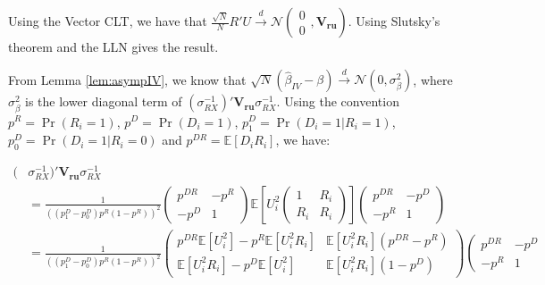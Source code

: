 \documentclass[]{book}
\newcommand{\esp}[1]{\mathbb{E}[ #1 ]}
\theoremstyle{definition}
\theoremstyle{definition}
\theoremstyle{definition}
\theoremstyle{remark}
\begin{document}
Using the Vector CLT, we have that
\(\frac{\sqrt{N}}{N}R'U\stackrel{d}{\rightarrow}\mathcal{N}\left(\begin{array}{c} 0\\ 0\end{array},\mathbf{V_{ru}}\right)\).
Using Slutsky's theorem and the LLN gives the result.

From Lemma \ref{lem:asympIV}, we know that
\(\sqrt{N}(\hat{\beta}_{IV}-\beta)\stackrel{d}{\rightarrow}\mathcal{N}(0,\sigma^2_{\beta})\),
where \(\sigma^2_{\beta}\) is the lower diagonal term of
\((\sigma_{RX}^{-1})'\mathbf{V_{ru}}\sigma_{RX}^{-1}\). Using the
convention \(p^R=\Pr(R_i=1)\), \(p^D=\Pr(D_i=1)\),
\(p^D_1=\Pr(D_i=1|R_i=1)\), \(p^D_0=\Pr(D_i=1|R_i=0)\) and
\(p^{DR}=\esp{D_iR_i}\), we have:

\begin{align*}
(&\sigma_{RX}^{-1})'\mathbf{V_{ru}}\sigma_{RX}^{-1} \\
                   & = \frac{1}{((p^D_1-p^D_0)p^R(1-p^R))^2}
                  \left(\begin{array}{cc}
                         p^{DR}  & -p^R\\
                        -p^D & 1
                          \end{array}\right)
                          \esp{U_i^2\left(\begin{array}{cc}  1 & R_i\\  R_i & R_i\end{array}\right)}
                        \left(\begin{array}{cc}
                                         p^{DR}  & -p^D\\
                                          -p^R & 1
                          \end{array}\right)\\
                    & = \frac{1}{((p^D_1-p^D_0)p^R(1-p^R))^2}
                         \left(\begin{array}{cc}
                         p^{DR}\esp{U_i^2}-p^R\esp{U_i^2R_i} & \esp{U_i^2R_i}(p^{DR}-p^R)\\
                        \esp{U_i^2R_i}-p^D\esp{U_i^2} & \esp{U_i^2R_i}(1-p^D)
                          \end{array}\right)
                          \left(\begin{array}{cc}
                                         p^{DR}  & -p^D\\
                                          -p^R & 1

\end{array}
\end{align*}
\end{document}

